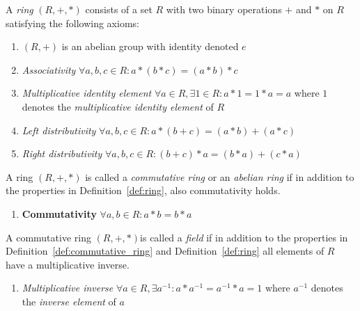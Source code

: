 \begin{defn}[Ring]
\label{def:ring}
  \setcounter{enumTemp}{\theenumi}
 A \textit{ring} $\left( R, +, * \right)$ consists of a set $R$ with two binary operations $+$ and $*$ on $R$ satisfying the following axioms:
 \begin{enumerate}
  \item $\left( R, + \right)$ is an abelian group with identity denoted $e$
  \item \textit{Associativity} $\forall a, b, c \in R: a*(b*c) = (a*b)*c$
  \item \textit{Multiplicative identity element} $\forall a \in R, \exists 1 \in R: a*1 = 1*a = a $ where $1$ denotes the \textit{multiplicative identity element} of $R$
  \item \textit{Left distributivity} $\forall a, b, c \in R: a*\left( b + c \right) = \left( a * b \right) + \left( a * c \right)$
  \item \textit{Right distributivity} $\forall a, b, c \in R: \left( b + c \right) * a = \left( b * a \right) + \left( c * a \right)$
   \setcounter{enumTemp}{\theenumi}
 \end{enumerate}
\end{defn}

\begin{defn}
 \label{def:commutative_ring}
 A ring $\left( R, +, * \right)$ is called a \textit{commutative ring} or an \textit{abelian ring} if in addition to the properties in Definition~\ref{def:ring}, also commutativity holds.
 \begin{enumerate}
  \setcounter{enumi}{\theenumTemp}
  \item \textbf{Commutativity} $\forall a, b \in R: a*b = b*a$
  \setcounter{enumTemp}{\theenumi}
 \end{enumerate}

\end{defn}

\begin{defn}[Field]
\label{def:field}
 A commutative ring $\left( R, +, * \right)$is called a \textit{field} if in addition to the properties in Definition~\ref{def:commutative_ring} and Definition~\ref{def:ring} all elements of $R$ have a multiplicative inverse.
 \begin{enumerate}
  \setcounter{enumi}{\theenumTemp}
   \item \textit{Multiplicative inverse} $\forall a \in R, \exists a^{-1}: a*a^{-1} = a^{-1}*a = 1$ where $a^{-1}$ denotes the \textit{inverse element} of $a$
 \end{enumerate}
\end{defn}

